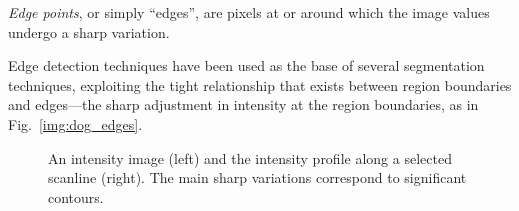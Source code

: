 \emph{Edge points}, or simply ``edges'', are pixels at or around which the image values undergo a sharp variation.

Edge detection techniques have been used as the base of several segmentation techniques, exploiting the tight relationship that exists between region boundaries and edges---the sharp adjustment in intensity at the region boundaries, as in Fig.~\ref{img:dog_edges}.

\begin{figure}
\centering
{} \quad

\caption[Edge detection and intensity profile]{An intensity image (left) and the intensity profile along a selected scanline (right). The main sharp variations correspond to significant contours.}
\label{fig:edge_det}
\end{figure}

